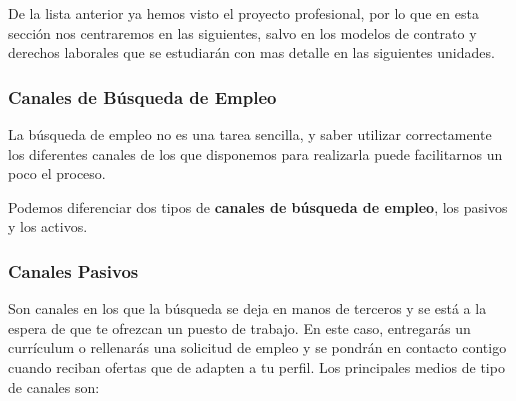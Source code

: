 De la lista anterior ya hemos visto el proyecto profesional, por lo que en esta sección nos centraremos en las siguientes, salvo en los modelos de contrato y derechos laborales que se estudiarán con mas detalle en las siguientes unidades.

\subsubsection{Canales de Búsqueda de Empleo}
La búsqueda de empleo no es una tarea sencilla, y saber utilizar correctamente los diferentes canales de los que disponemos para realizarla puede facilitarnos un poco el proceso.

Podemos diferenciar dos tipos de \textbf{canales de búsqueda de empleo}, los pasivos y los activos.


\subsubsection*{Canales Pasivos}
Son canales en los que la búsqueda se deja en manos de terceros y se está a la espera de que te ofrezcan un puesto de trabajo. En este caso, entregarás un currículum o rellenarás una solicitud de empleo y se pondrán en contacto contigo cuando reciban ofertas que de adapten a tu perfil. Los principales medios de tipo de canales son:

